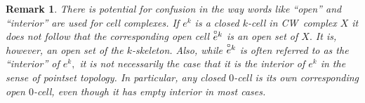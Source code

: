 \documentclass[12pt]{article}
\newtheorem{rmk}{Remark}
\newcommand{\oce}{\smash{\overset{\circ}e}}
\begin{document}
\begin{rmk}
There is potential for confusion in the way words like ``open'' and ``interior'' are used for cell complexes. If $e^k$ is a closed $k$-cell in CW~complex $X$ it does {\em not} follow that the corresponding open cell $\oce^k$ is an open set of $X.$ It is, however, an open set of the $k$-skeleton. 
Also, while $\oce^k$ is often referred to as the ``interior'' of $e^k,$ it is not necessarily the case that it is the interior of $e^k$ in the sense of pointset topology. In particular, any closed $0$-cell is its own corresponding open $0$-cell, even though it has empty interior in most cases.
\end{rmk}
\end{document}
